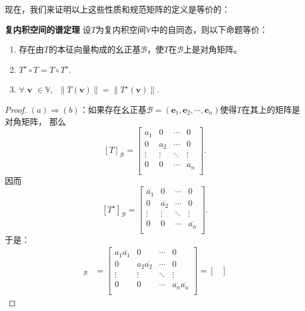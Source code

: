 \documentclass[12pt,UTF8]{ctexbook}
\begin{document}
现在，我们来证明以上这些性质和规范矩阵的定义是等价的：
\begin{pp}\textbf{复内积空间的谱定理 }\label{pp:8_9}
    设$T$为复内积空间$\mathbb{V}$中的自同态，则以下命题等价：
    \begin{enumerate}[label=\alph*.]   
        \item 存在由$T$的本征向量构成的幺正基$\mathcal{B}$，使$T$在$\mathcal{B}$上是对角矩阵。
        \item $T^\star\circ T = T\circ T^\star.$
        \item $\forall \,\, \mathbf{v} \,\, \in \mathbb{V}, \,\,\, \| T(\mathbf{v})\| = \| T^\star(\mathbf{v})\|.$
    \end{enumerate}
\end{pp}
\begin{proof} %
    $(a)\Rightarrow (b)$：如果存在幺正基$\mathcal{B} = (\mathbf{e}_1, \mathbf{e}_2, \cdots , \mathbf{e}_n)$使得$T$在其上的矩阵是对角矩阵，
    那么
    $$[T]_{\mathcal{B}} = \begin{bmatrix}
        a_1 & 0 & \cdots & 0 \\
        0 & a_2 & \cdots & 0 \\
        \vdots & \vdots & \ddots & \vdots \\
        0 & 0 & \cdots & a_n \\
    \end{bmatrix}.
    $$
    因而
    $$[T^\star]_{\mathcal{B}} = \begin{bmatrix}
        \overline{a_1} & 0 & \cdots & 0 \\
        0 & \overline{a_2} & \cdots & 0 \\
        \vdots & \vdots & \ddots & \vdots \\
        0 & 0 & \cdots & \overline{a_n} \\
    \end{bmatrix}.
    $$
    于是：
    \begin{align*}
        [T\circ T^\star]_{\mathcal{B}} &= \begin{bmatrix}
            a_1\overline{a_1} & 0 & \cdots & 0 \\
            0 & a_2\overline{a_2} & \cdots & 0 \\
            \vdots & \vdots & \ddots & \vdots \\
            0 & 0 & \cdots & a_n\overline{a_n} \\
        \end{bmatrix} = \begin{bmatrix}

\end{bmatrix}
\end{align*}
\end{proof}
\end{document}
